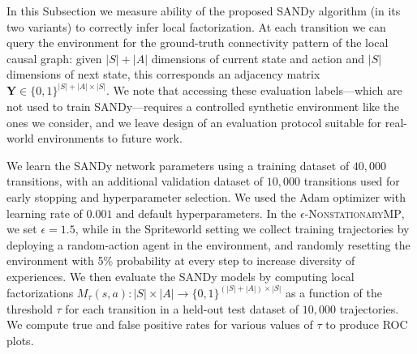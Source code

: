 \documentclass[coda.tex]{subfiles}
\begin{document}
In this Subsection we measure ability of the proposed SANDy algorithm (in its two variants) to correctly infer local factorization.
At each transition we can query the environment for the ground-truth connectivity pattern of the local causal graph: given $|S|+|A|$ dimensions of current state and action and $|S|$ dimensions of next state, this corresponds an adjacency matrix $\mathbf{Y} \in \{0, 1\}^{|S|+|A|\times|S|}$.%
We note that accessing these evaluation labels---which are not used to train SANDy---requires a controlled synthetic environment like the ones we consider, and we leave design of an evaluation protocol suitable for real-world environments to future work.

We learn the SANDy network parameters using a training dataset of $40,000$ transitions, with an additional validation dataset of $10,000$ transitions used for early stopping and hyperparameter selection.
We used the Adam optimizer with learning rate of $0.001$ and default hyperparameters.
In the \textsc{$\epsilon$-NonstationaryMP}, we set $\epsilon=1.5$, while in the Spriteworld setting we collect training trajectories by deploying a random-action agent in the environment, and randomly resetting the environment with 5\% probability at every step to increase diversity of experiences.
We then evaluate the SANDy models by computing local factorizations $M_\tau(s, a): |S| \times |A| \to \{0, 1\}^{(|S|+|A|)\times|S|}$ as a function of the threshold $\tau$ for each transition in a held-out test dataset of $10,000$ trajectories.
We compute true and false positive rates for various values of $\tau$ to produce ROC plots.
\end{document}
